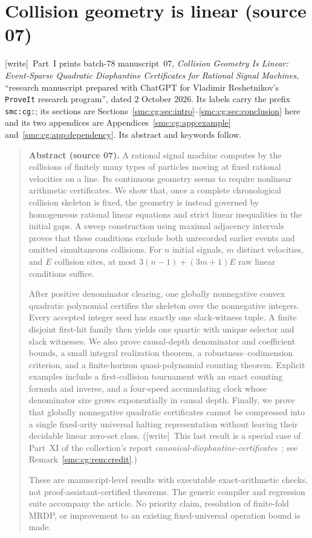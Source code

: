 \documentclass[11pt,letterpaper]{article}
\numberwithin{equation}{section}
\theoremstyle{definition}
\theoremstyle{remark}
\newcommand{\wtag}{\textup{[write]}}
\begin{document}
\part{Collision geometry is linear (source 07)}\label{smc:part:cg}

\noindent\wtag\ Part~I prints batch-78 manuscript~07, \emph{Collision Geometry Is Linear: Event-Sparse Quadratic Diophantine Certificates for Rational Signal Machines}, ``research manuscript prepared with ChatGPT for Vladimir Reshetnikov's \texttt{ProveIt} research program'', dated 2 October 2026. Its labels carry the prefix \texttt{smc:cg:}; its sections are Sections~\ref{smc:cg:sec:intro}--\ref{smc:cg:sec:conclusion} here and its two appendices are Appendices~\ref{smc:cg:app:example} and~\ref{smc:cg:app:dependency}. Its abstract and keywords follow.
\begin{quote}\small
\textbf{Abstract (source 07).} A rational signal machine computes by the collisions of finitely many types
of particles moving at fixed rational velocities on a line. Its continuous
geometry seems to require nonlinear arithmetic certificates. We show that,
once a complete chronological collision skeleton is fixed, the geometry is
instead governed by homogeneous rational linear equations and strict linear
inequalities in the initial gaps. A sweep construction using maximal
adjacency intervals proves that these conditions exclude both unrecorded
earlier events and omitted simultaneous collisions. For $n$ initial signals,
$m$ distinct velocities, and $E$ collision sites, at most
$3(n-1)+(3m+1)E$ raw linear conditions suffice.

After positive denominator clearing, one globally nonnegative convex
quadratic polynomial certifies the skeleton over the nonnegative integers.
Every accepted integer seed has exactly one slack-witness tuple. A finite
disjoint first-hit family then yields one quartic with unique selector and
slack witnesses. We also
prove causal-depth denominator and coefficient bounds, a small integral
realization theorem, a robustness--codimension criterion, and a
finite-horizon quasi-polynomial counting theorem. Explicit examples include
a first-collision tournament with an exact counting formula and inverse,
and a four-speed accumulating clock whose denominator size grows
exponentially in causal depth. Finally, we prove that globally nonnegative
quadratic certificates cannot be compressed into a single fixed-arity
universal halting representation without leaving their decidable linear
zero-set class. (\wtag\ This last result is a special case of Part~XI of the collection's report \emph{canonical-diophantine-certificates}~\cite{cdc}; see Remark~\ref{smc:cg:rem:credit}.)

These are manuscript-level results with executable exact-arithmetic checks,
not proof-assistant-certified theorems. The generic compiler and regression
suite accompany the article. No priority claim, resolution of finite-fold
MRDP, or improvement to an existing fixed-universal operation bound is made.
\end{quote}
\end{document}
